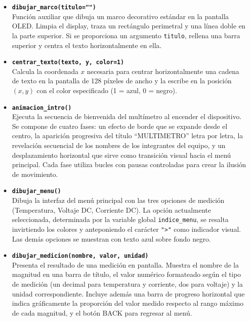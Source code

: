 \documentclass[letterpaper,12pt]{article}
\begin{document}
    \begin{itemize}
        \item \textbf{\texttt{dibujar\_marco(titulo="")}} \\
        Función auxiliar que dibuja un marco decorativo estándar en la pantalla OLED. Limpia el display, traza un rectángulo perimetral y una línea doble en la parte superior. Si se proporciona un argumento \texttt{titulo}, rellena una barra superior y centra el texto horizontalmente en ella.

        \item \textbf{\texttt{centrar\_texto(texto, y, color=1)}} \\
        Calcula la coordenada $x$ necesaria para centrar horizontalmente una cadena de texto en la pantalla de 128 píxeles de ancho y la escribe en la posición $(x, y)$ con el color especificado (1 = azul, 0 = negro).

        \item \textbf{\texttt{animacion\_intro()}} \\
        Ejecuta la secuencia de bienvenida del multímetro al encender el dispositivo. Se compone de cuatro fases: un efecto de borde que se expande desde el centro, la aparición progresiva del título ``MULTIMETRO'' letra por letra, la revelación secuencial de los nombres de los integrantes del equipo, y un desplazamiento horizontal que sirve como transición visual hacia el menú principal. Cada fase utiliza bucles con pausas controladas para crear la ilusión de movimiento.

        \item \textbf{\texttt{dibujar\_menu()}} \\
        Dibuja la interfaz del menú principal con las tres opciones de medición (Temperatura, Voltaje DC, Corriente DC). La opción actualmente seleccionada, determinada por la variable global \texttt{indice\_menu}, se resalta invirtiendo los colores y anteponiendo el carácter \texttt{">"} como indicador visual. Las demás opciones se muestran con texto azul sobre fondo negro.

        \item \textbf{\texttt{dibujar\_medicion(nombre, valor, unidad)}} \\
        Presenta el resultado de una medición en pantalla. Muestra el nombre de la magnitud en una barra de título, el valor numérico formateado según el tipo de medición (un decimal para temperatura y corriente, dos para voltaje) y la unidad correspondiente. Incluye además una barra de progreso horizontal que indica gráficamente la proporción del valor medido respecto al rango máximo de cada magnitud, y el botón BACK para regresar al menú.
    \end{itemize}
\end{document}
